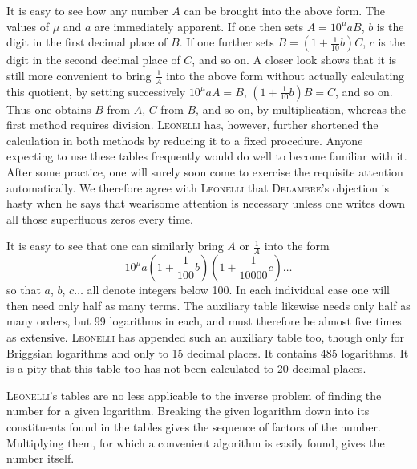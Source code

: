 It is easy to see how any number $A$ can be brought into the above form. The values of $\mu$ and $a$ are immediately apparent. If one then sets $A = 10^{\mu} a B$, $b$ is the digit in the first decimal place of $B$. If one further sets $B = \left(1+\frac{1}{10} b\right) C$, $c$ is the digit in the second decimal place of $C$, and so on. A closer look shows that it is still more convenient to bring $\frac{1}{A}$ into the above form without actually calculating this quotient, by setting successively $10^{\mu} a A = B$, $\left(1+\frac{1}{10} b\right) B = C$, and so on. Thus one obtains $B$ from $A$, $C$ from $B$, and so on, by multiplication, whereas the first method requires division. \textsc{Leonelli} has, however, further shortened the calculation in both methods by reducing it to a fixed procedure. Anyone expecting to use these tables frequently would do well to become familiar with it. After some practice, one will surely soon come to exercise the requisite attention automatically. We therefore agree with \textsc{Leonelli} that \textsc{Delambre}'s objection is hasty when he says that wearisome attention is necessary unless one writes down all those superfluous zeros every time.

It is easy to see that one can similarly bring $A$ or $\frac{1}{A}$ into the form
\[
10^{\mu} a \left(1+\frac{1}{100} b\right)\left(1+\frac{1}{10000} c\right)\ldots
\]
so that $a$, $b$, $c\ldots$ all denote integers below 100. In each individual case one will then need only half as many terms. The auxiliary table likewise needs only half as many orders, but 99 logarithms in each, and must therefore be almost five times as extensive. \textsc{Leonelli} has appended such an auxiliary table too, though only for Briggsian logarithms and only to 15 decimal places. It contains 485 logarithms. It is a pity that this table too has not been calculated to 20 decimal places.

\textsc{Leonelli}'s tables are no less applicable to the inverse problem of finding the number for a given logarithm. Breaking the given logarithm down into its constituents found in the tables gives the sequence of factors of the number. Multiplying them, for which a convenient algorithm is easily found, gives the number itself.

